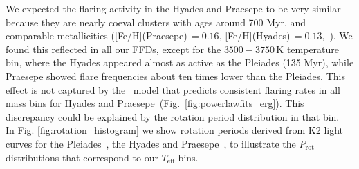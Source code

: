 \documentclass{aa}
\begin{document}
We expected the flaring activity in the Hyades and Praesepe to be very similar because they are nearly coeval clusters with ages around 700 Myr, and comparable metallicities ([Fe/H](Praesepe)\,$=0.16$, [Fe/H](Hyades)\,$=0.13$,~\citealt{netopil_metallicities_2016}). We found this reflected in all our FFDs, except for the $3500-3750$\,K temperature bin, where the Hyades appeared almost as active as the Pleiades (135 Myr), while Praesepe showed flare frequencies about ten times lower than the Pleiades. This effect is not captured by the~\citet{davenport2019} model that predicts consistent flaring rates in all mass bins for Hyades and Praesepe~(Fig.~\ref{fig:powerlawfits_erg}). This discrepancy could be explained by the rotation period distribution in that bin. 
\\
In Fig. \ref{fig:rotation_histogram} we show rotation periods derived from K2 light curves for the Pleiades~\citep{rebull_pleiadesrot_2016}, the Hyades and Praesepe~\citep{douglas2019}, to illustrate the $P_\mathrm{rot}$ distributions that correspond to our $T_\mathrm{eff}$ bins.
\\
\end{document}
